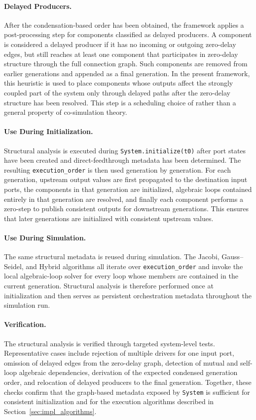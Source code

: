 \paragraph{Delayed Producers.}
After the condensation-based order has been obtained, the framework applies a post-processing step for components classified as delayed producers.
A component is considered a delayed producer if it has no incoming or outgoing zero-delay edges, but still reaches at least one component that participates in zero-delay structure through the full connection graph.
Such components are removed from earlier generations and appended as a final generation.
In the present framework, this heuristic is used to place components whose outputs affect the strongly coupled part of the system only through delayed paths after the zero-delay structure has been resolved.
This step is a scheduling choice of \syssimx{} rather than a general property of co-simulation theory.

\paragraph{Use During Initialization.}
Structural analysis is executed during \texttt{System.initialize(t0)} after port states have been created and direct-feedthrough metadata has been determined.
The resulting \texttt{execution\_order} is then used generation by generation.
For each generation, upstream output values are first propagated to the destination input ports, the components in that generation are initialized, algebraic loops contained entirely in that generation are resolved, and finally each component performs a zero-step to publish consistent outputs for downstream generations.
This ensures that later generations are initialized with consistent upstream values.

\paragraph{Use During Simulation.}
The same structural metadata is reused during simulation.
The Jacobi, Gauss--Seidel, and Hybrid algorithms all iterate over \texttt{execution\_order} and invoke the local algebraic-loop solver for every loop whose members are contained in the current generation.
Structural analysis is therefore performed once at initialization and then serves as persistent orchestration metadata throughout the simulation run.

\paragraph{Verification.}
The structural analysis is verified through targeted system-level tests.
Representative cases include rejection of multiple drivers for one input port, omission of delayed edges from the zero-delay graph, detection of mutual and self-loop algebraic dependencies, derivation of the expected condensed generation order, and relocation of delayed producers to the final generation.
Together, these checks confirm that the graph-based metadata exposed by \texttt{System} is sufficient for consistent initialization and for the execution algorithms described in Section~\ref{sec:impl_algorithms}.